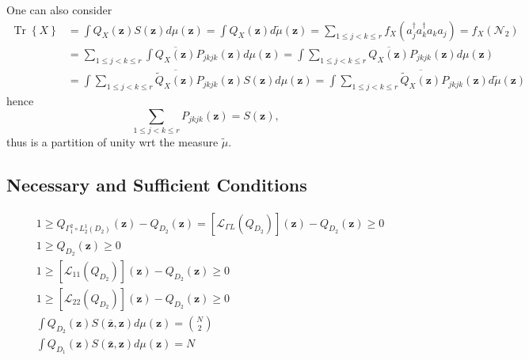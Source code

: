 \documentclass[aps,preprint]{revtex4}%
\begin{document}
One can also consider
\begin{align}
\operatorname*{Tr}\left\{  X\right\}   &  =\int Q_{X}\left(  \mathbf{z}%
\right)  S\left(  \mathbf{z}\right)  d\mu\left(  \mathbf{z}\right)  =\int
Q_{X}\left(  \mathbf{z}\right)  d\tilde{\mu}\left(  \mathbf{z}\right)
=\sum_{1\leq j<k\leq r}f_{X}\left(  a_{j}^{\dagger}a_{k}^{\dagger}a_{k}%
a_{j}\right)  =f_{X}\left(  \mathcal{N}_{2}\right) \nonumber\\
&  =\sum_{1\leq j<k\leq r}\int\overline{Q_{X}\left(  \mathbf{z}\right)
}P_{jkjk}\left(  \mathbf{z}\right)  d\mu\left(  \mathbf{z}\right)  =\int%
\sum_{1\leq j<k\leq r}\overline{Q_{X}\left(  \mathbf{z}\right)  }%
P_{jkjk}\left(  \mathbf{z}\right)  d\mu\left(  \mathbf{z}\right) \nonumber\\
&  =\int\sum_{1\leq j<k\leq r}\overline{\tilde{Q}_{X}\left(  \mathbf{z}%
\right)  }P_{jkjk}\left(  \mathbf{z}\right)  S\left(  \mathbf{z}\right)
d\mu\left(  \mathbf{z}\right)  =\int\sum_{1\leq j<k\leq r}\overline{\tilde
{Q}_{X}\left(  \mathbf{z}\right)  }P_{jkjk}\left(  \mathbf{z}\right)
d\tilde{\mu}\left(  \mathbf{z}\right)
\end{align}
hence%
\begin{equation}
\sum_{1\leq j<k\leq r}P_{jkjk}\left(  \mathbf{z}\right)  =S\left(
\mathbf{z}\right)  ,
\end{equation}
thus is a partition of unity wrt the measure $\tilde{\mu}$.

\subsection{ \textbf{Necessary and Sufficient Conditions}}%

\begin{align}
&  1\geq Q_{\Gamma_{1}^{2}\circ L_{2}^{1}\left(  D_{2}\right)  }\left(
\mathbf{z}\right)  -Q_{D_{2}}\left(  \mathbf{z}\right)  =\left[
\mathcal{L}_{\Gamma L}\left(  Q_{D_{2}}\right)  \right]  \left(
\mathbf{z}\right)  -Q_{D_{2}}\left(  \mathbf{z}\right)  \geq0\\
&  1\geq Q_{D_{2}}\left(  \mathbf{z}\right)  \geq0\\
&  1\geq\left[  \mathcal{L}_{11}\left(  Q_{D_{2}}\right)  \right]  \left(
\mathbf{z}\right)  -Q_{D_{2}}\left(  \mathbf{z}\right)  \geq0\\
&  1\geq\left[  \mathcal{L}_{22}\left(  Q_{D_{2}}\right)  \right]  \left(
\mathbf{z}\right)  -Q_{D_{2}}\left(  \mathbf{z}\right)  \geq0\\
&  \int Q_{D_{2}}\left(  \mathbf{z}\right)  S\left(  \mathbf{\bar{z}%
,z}\right)  d\mu\left(  \mathbf{z}\right)  =\binom{N}{2}\\
&  \int Q_{D_{1}}\left(  \mathbf{z}\right)  S\left(  \mathbf{\bar{z}%
,z}\right)  d\mu\left(  \mathbf{z}\right)  =N
\end{align}
\end{document}
